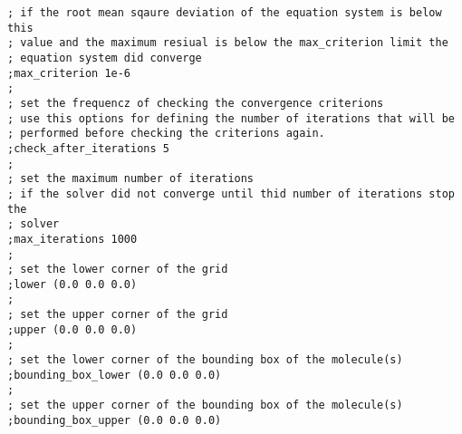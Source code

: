 \documentclass[12pt,twoside,a4paper]{article}
\begin{document}
\begin{verbatim}
; if the root mean sqaure deviation of the equation system is below this
; value and the maximum resiual is below the max_criterion limit the
; equation system did converge
;max_criterion 1e-6
;
; set the frequencz of checking the convergence criterions
; use this options for defining the number of iterations that will be
; performed before checking the criterions again.
;check_after_iterations 5
;
; set the maximum number of iterations
; if the solver did not converge until thid number of iterations stop the
; solver
;max_iterations 1000
;
; set the lower corner of the grid
;lower (0.0 0.0 0.0)
;
; set the upper corner of the grid
;upper (0.0 0.0 0.0)
;
; set the lower corner of the bounding box of the molecule(s)
;bounding_box_lower (0.0 0.0 0.0)
;
; set the upper corner of the bounding box of the molecule(s)
;bounding_box_upper (0.0 0.0 0.0)
\end{verbatim}
\normalsize
\end{document}
